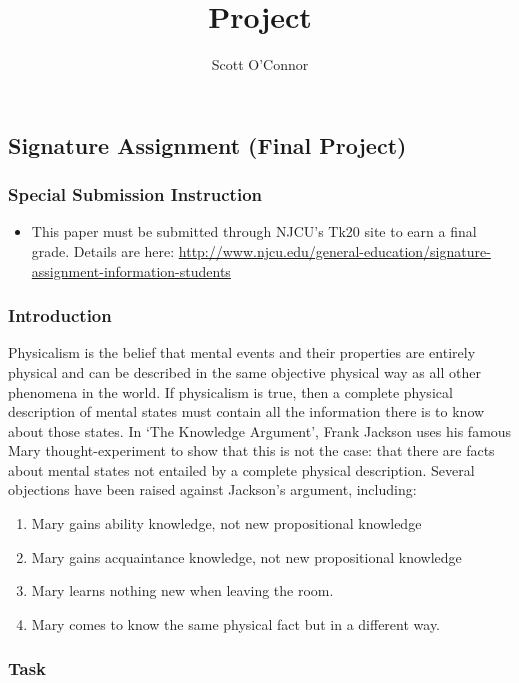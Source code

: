 \documentclass[]{article}
\title{Project}
\author{Scott O’Connor}
\providecommand{\tightlist}{%
  \setlength{\itemsep}{0pt}\setlength{\parskip}{0pt}}
\begin{document}
\subsection{Signature Assignment (Final
Project)}\label{signature-assignment-final-project}

\subsubsection{Special Submission
Instruction}\label{special-submission-instruction}

\begin{itemize}
\tightlist
\item
  This paper must be submitted through NJCU's Tk20 site to earn a final
  grade. Details are here:
  \url{http://www.njcu.edu/general-education/signature-assignment-information-students}
\end{itemize}

\subsubsection{Introduction}\label{introduction}

Physicalism is the belief that mental events and their properties are
entirely physical and can be described in the same objective physical
way as all other phenomena in the world. If physicalism is true, then a
complete physical description of mental states must contain all the
information there is to know about those states. In `The Knowledge
Argument', Frank Jackson uses his famous Mary thought-experiment to show
that this is not the case: that there are facts about mental states not
entailed by a complete physical description. Several objections have
been raised against Jackson's argument, including:

\begin{enumerate}
\def\labelenumi{\arabic{enumi}.}
\tightlist
\item
  Mary gains ability knowledge, not new propositional knowledge
\item
  Mary gains acquaintance knowledge, not new propositional knowledge
\item
  Mary learns nothing new when leaving the room.
\item
  Mary comes to know the same physical fact but in a different way.
\end{enumerate}

\subsubsection{Task}\label{task}
\end{document}
